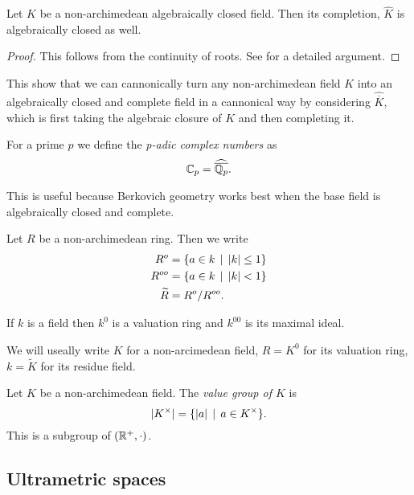 \begin{theorem}
	Let $K$ be a non-archimedean algebraically closed field. 
	Then its completion, $\widehat K$ is algebraically closed as well. 
\end{theorem}
\begin{proof}
	This follows from the continuity of roots. See \cite[][lem A.6]{boschLecturesFormalRigid2014} for a detailed argument. 
\end{proof}

This show that we can cannonically turn any non-archimedean field $K$ into an algebraically closed and complete field in a cannonical way by considering $\widehat{\overline{K}}$, which is first taking the algebraic closure of $K$ and then completing it. 

\begin{definition}
	For a prime $p$ we define the \emph{p-adic complex numbers} as \[
	\mathbb{C}_p = \widehat{\overline{\mathbb{Q}_p}}
	.\] 
\end{definition}

This is useful because Berkovich geometry works best when the base field is algebraically closed and complete. 

\begin{definition}
	Let $R$ be a non-archimedean ring. Then we write 
	\begin{align*}
		R^{o} &= \{a \in k \st |k| \le 1\}  \\
		R^{oo} &=  \{a \in k \st |k| < 1\}  \\
		\widetilde R &= R^{o} / R^{oo}
	.\end{align*}
\end{definition}
If $k$ is a field then $k^{0}$ is a valuation ring and $ k^{00}$ is its maximal ideal. 

We will useally write $K$ for a non-arcimedean field, $R = K^{0}$ for its valuation ring, $k = \widetilde K$ for its residue field. 

\begin{definition}
	Let $K$ be a non-archimedean field. 
	The \emph{value group of $K$} is \[
	|K^{\times }| = \{|a| \st  a \in K^{\times }  \} 
	.\] 
	This is a subgroup of $(\mathbb{R}^{ +}, \cdot )$. 
\end{definition}


\subsection{Ultrametric spaces} \label{sec:ultrametric_spaces}


